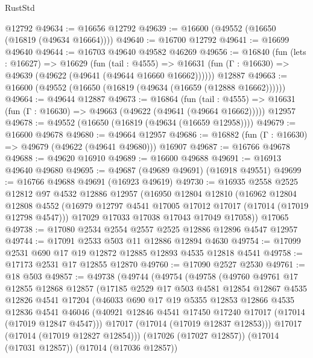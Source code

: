 \begin{lexlean}{RustStd}
\begin{coremodule}
    @12792
@49634 := @16656 @12792
@49639 := @16600 (@49552 (@16650 (@16819 (@49634 @16664))))
@49640 := @16700 @12792
@49641 := @16699 @49640
@49644 := @16703 @49640 @49582 @46269
@49656 := @16840
    (fun (lets : @16627) =>
    @16629
      (fun (tail : @4555) =>
      @16631 (fun (Γ : @16630) => @49639 (@49622 (@49641 (@49644 @16660 @16662))))))
    @12887
@49663 := @16600 (@49552 (@16650 (@16819 (@49634 (@16659 (@12888 @16662))))))
@49664 := @49644 @12887
@49673 := @16864
    (fun (tail : @4555) => @16631 (fun (Γ : @16630) => @49663 (@49622 (@49641 (@49664 @16662)))))
    @12957
@49678 := @49552 (@16650 (@16819 (@49634 (@16659 @12958))))
@49679 := @16600 @49678
@49680 := @49664 @12957
@49686 := @16882 (fun (Γ : @16630) => @49679 (@49622 (@49641 @49680))) @16907
@49687 := @16766 @49678
@49688 := @49620 @16910
@49689 := @16600 @49688
@49691 := @16913 @49640 @49680
@49695 := @49687 (@49689 @49691) (@16918 @49551)
@49699 := @16766 @49688 @49691 (@16923 @49619)
@49730 := @16935
    @2558
    @2525
    @12812
    @97
    @4532
    @12886
    @12957
    (@16950
      @12804
      @12810
      (@16962
        @12804
        @12808
        @4552
        (@16979 @12797 @4541 @17005 @17012 @17017 (@17014 (@17019 @12798 @4547)))
        @17029
        @17033
        @17038
        @17043
        @17049
        @17058))
    @17065
@49738 := @17080 @2534 @2554 @2557 @2525 @12886 @12896 @4547 @12957
@49744 := @17091 @2533 @503 @11 @12886 @12894 @4630
@49754 := @17099 @2531 @690 @17 @19 @12872 @12885 @12893 @4535 @12818 @4541
@49758 := @17173 @2531 @17 @12855 @12870
@49760 := @17090 @2527 @2530
@49761 := @18 @503
@49857 := @49738
    (@49744
      (@49754
        (@49758
          (@49760
            @49761
            @17
            @12855
            @12868
            @12857
            (@17185
              @2529
              @17
              @503
              @4581
              @12854
              @12867
              @4535
              @12826
              @4541
              @17204
              (@46033
                @690
                @17
                @19
                @5355
                @12853
                @12866
                @4535
                @12836
                @4541
                @46046
                (@40921 @12846 @4541 @17450 @17240 @17017 (@17014 (@17019 @12847 @4547)))
                @17017
                (@17014 (@17019 @12837 @12853)))
              @17017
              (@17014 (@17019 @12827 @12854)))
            (@17026 (@17027 @12857))
            (@17014 (@17031 @12857))
            (@17014 (@17036 @12857))

\end{coremodule}
\end{lexlean}
